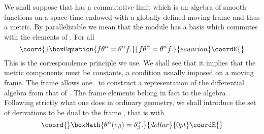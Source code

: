 \documentclass[12pt,a4paper]{article}
\newcounter{eg}
\def\c#1{{\cal #1}}
\begin{document}
We shall suppose that \myHighlight{$\c{A}$}\coordHE{} has a commutative limit which is an
algebra \myHighlight{$\c{C}(V)$}\coordHE{} of smooth functions on a space-time \coordHE{} endowed
with a globally defined moving frame \myHighlight{$\theta^\alpha$}\coordHE{} and thus a
metric.  By parallelizable we mean that the module \myHighlight{$\Omega^1(\c{A})$}\coordHE{}
has a basis \myHighlight{$\theta^\alpha$}\coordHE{} which commutes with the elements of
\myHighlight{$\c{A}$}\coordHE{}. For all \myHighlight{$f \in \c{A}$}\coordHE{}
\begin{equation}\coord{}\boxEquation{
f\theta^\alpha = \theta^\alpha f.                          \label{f-theta}
}{
f\theta^\alpha = \theta^\alpha f.                          }{ecuacion}\coordE{}\end{equation}
This is the correspondence principle we use. We shall see that it
implies that the metric components must be constants, a condition
usually imposed on a moving frame. The frame \myHighlight{$\theta^\alpha$}\coordHE{} allows
one~\cite{Mad00c} to construct a representation of the differential
algebra from that of \myHighlight{$\c{A}$}\coordHE{}. The frame elements belong in fact to the
algebra \myHighlight{$\c{A}^\prime_\rho$}\coordHE{}. Following strictly what one does in
ordinary geometry, we shall introduce the set of derivations
\coordHE{} to be dual to the frame \myHighlight{$\theta^\alpha$}\coordHE{}, that is with
$$\coord{}\boxMath{
\theta^\alpha(e_\beta) = \delta^\alpha_\beta.
}{dollar}{0pt}\coordE{}$$ 
\end{document}
